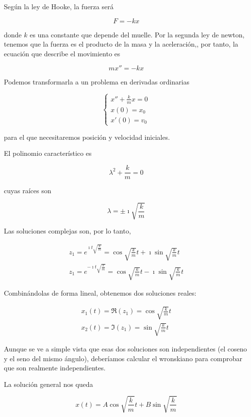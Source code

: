 Según la ley de Hooke, la fuerza será

\[ F = -kx \]

donde $k$ es una constante que depende del muelle. Por la segunda ley de newton, tenemos que la fuerza es el producto de la masa y la aceleración,, por tanto, la ecuación que describe el movimiento es 

\[ mx'' = -kx \]

Podemos transformarla a un problema en derivadas ordinarias

$$\left\lbrace \begin{array}{l}
x'' + \frac{k}{m}x = 0\\
x(0) = x_0\\
x'(0) = v_0
\end{array}\right. $$

para el que necesitaremos posición y velocidad iniciales. 

El polinomio característico es

\[ λ^2 + \frac{k}{m} = 0 \]

cuyas raíces son 

\[ λ=\pm \imath \sqrt{\frac{k}{m}} \]

Las soluciones complejas son, por lo tanto,

\begin{gather*}
z_1 = e^{\imath t\sqrt{\frac{k}{m}}} = \cos \sqrt{\frac{k}{m}} t + \imath\sin \sqrt{\frac{k}{m}} t \\
z_1 = e^{-\imath t\sqrt{\frac{k}{m}}} = \cos \sqrt{\frac{k}{m}} t - \imath\sin \sqrt{\frac{k}{m}} t 
\end{gather*}

Combinándolas de forma lineal, obtenemos dos soluciones reales:

\begin{gather*}
x_1(t) = \Re (z_1) = \cos \sqrt{\frac{k}{m}} t \\
x_2(t) = \Im (z_1) = \sin \sqrt{\frac{k}{m}} t
\end{gather*}

Aunque se ve a simple vista que esas dos soluciones son independientes (el coseno y el seno del mismo ángulo), deberíamos calcular el wronskiano para comprobar que son realmente independientes.

La solución general nos queda

\begin{equation}\label{eqMasaResorte} x(t) = A\cos \sqrt{\frac{k}{m}} t + B \sin \sqrt{\frac{k}{m}} 
\end{equation}

